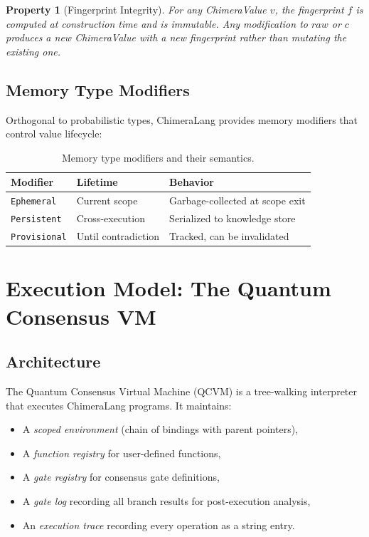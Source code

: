 \documentclass[11pt,a4paper]{article}
\newtheorem{property}{Property}[section]
\begin{document}
\begin{property}[Fingerprint Integrity]
For any ChimeraValue $v$, the fingerprint $f$ is computed at construction time
and is immutable. Any modification to $\mathit{raw}$ or $c$ produces a new
ChimeraValue with a new fingerprint rather than mutating the existing one.
\end{property}

\subsection{Memory Type Modifiers}

Orthogonal to probabilistic types, ChimeraLang provides memory modifiers that
control value lifecycle:

\begin{table}[H]
\centering
\caption{Memory type modifiers and their semantics.}
\label{tab:memory}
\begin{tabular}{@{}lll@{}}
\toprule
\textbf{Modifier} & \textbf{Lifetime} & \textbf{Behavior} \\
\midrule
\texttt{Ephemeral}   & Current scope  & Garbage-collected at scope exit \\
\texttt{Persistent}   & Cross-execution & Serialized to knowledge store \\
\texttt{Provisional}  & Until contradiction & Tracked, can be invalidated \\
\bottomrule
\end{tabular}
\end{table}

\section{Execution Model: The Quantum Consensus VM}
\label{sec:execution}

\subsection{Architecture}

The Quantum Consensus Virtual Machine (QCVM) is a tree-walking interpreter
that executes ChimeraLang programs. It maintains:

\begin{itemize}[leftmargin=2em]
  \item A \emph{scoped environment} (chain of bindings with parent pointers),
  \item A \emph{function registry} for user-defined functions,
  \item A \emph{gate registry} for consensus gate definitions,
  \item A \emph{gate log} recording all branch results for post-execution analysis,
  \item An \emph{execution trace} recording every operation as a string entry.
\end{itemize}
\end{document}
